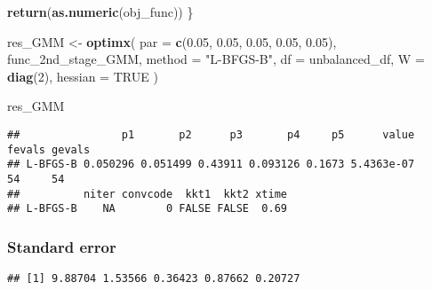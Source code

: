 \documentclass[
]{article}
\newenvironment{Shaded}{\begin{snugshade}}{\end{snugshade}}
\newcommand{\AttributeTok}[1]{\textcolor[rgb]{0.13,0.29,0.53}{#1}}
\newcommand{\ConstantTok}[1]{\textcolor[rgb]{0.56,0.35,0.01}{#1}}
\newcommand{\DecValTok}[1]{\textcolor[rgb]{0.00,0.00,0.81}{#1}}
\newcommand{\FloatTok}[1]{\textcolor[rgb]{0.00,0.00,0.81}{#1}}
\newcommand{\FunctionTok}[1]{\textcolor[rgb]{0.13,0.29,0.53}{\textbf{#1}}}
\newcommand{\NormalTok}[1]{#1}
\newcommand{\OtherTok}[1]{\textcolor[rgb]{0.56,0.35,0.01}{#1}}
\newcommand{\SpecialCharTok}[1]{\textcolor[rgb]{0.81,0.36,0.00}{\textbf{#1}}}
\newcommand{\StringTok}[1]{\textcolor[rgb]{0.31,0.60,0.02}{#1}}
\begin{document}
\begin{Shaded}
\begin{Highlighting}[]
  \FunctionTok{return}\NormalTok{(}\FunctionTok{as.numeric}\NormalTok{(obj\_func))}
\NormalTok{\}}

\NormalTok{res\_GMM }\OtherTok{\textless{}{-}}
  \FunctionTok{optimx}\NormalTok{(}
    \AttributeTok{par =} \FunctionTok{c}\NormalTok{(}\FloatTok{0.05}\NormalTok{, }\FloatTok{0.05}\NormalTok{, }\FloatTok{0.05}\NormalTok{, }\FloatTok{0.05}\NormalTok{, }\FloatTok{0.05}\NormalTok{),}
\NormalTok{    func\_2nd\_stage\_GMM,}
    \AttributeTok{method =} \StringTok{"L{-}BFGS{-}B"}\NormalTok{,}
    \AttributeTok{df =}\NormalTok{ unbalanced\_df,}
    \AttributeTok{W =} \FunctionTok{diag}\NormalTok{(}\DecValTok{2}\NormalTok{),}
    \AttributeTok{hessian =} \ConstantTok{TRUE}
\NormalTok{  )}

\NormalTok{res\_GMM}
\end{Highlighting}
\end{Shaded}

\begin{verbatim}
##                p1       p2      p3       p4     p5      value fevals gevals
## L-BFGS-B 0.050296 0.051499 0.43911 0.093126 0.1673 5.4363e-07     54     54
##          niter convcode  kkt1  kkt2 xtime
## L-BFGS-B    NA        0 FALSE FALSE  0.69
\end{verbatim}

\hypertarget{standard-error}{%
\subsubsection{Standard error}\label{standard-error}}

\begin{Shaded}
\end{Shaded}

\begin{verbatim}
## [1] 9.88704 1.53566 0.36423 0.87662 0.20727
\end{verbatim}
\end{document}
